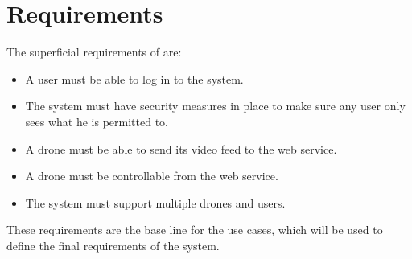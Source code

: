 \section{Requirements}
The superficial requirements of \projectname{} are:

\begin{itemize}
	\item A user must be able to log in to the system.
	\item The system must have security measures in place to make sure any user only sees what he is permitted to. 
	\item A drone must be able to send its video feed to the web service.
	\item A drone must be controllable from the web service. 
	\item The system must support multiple drones and users. 
\end{itemize}

These requirements are the base line for the use cases, which will be used to define the final requirements of the system. 
